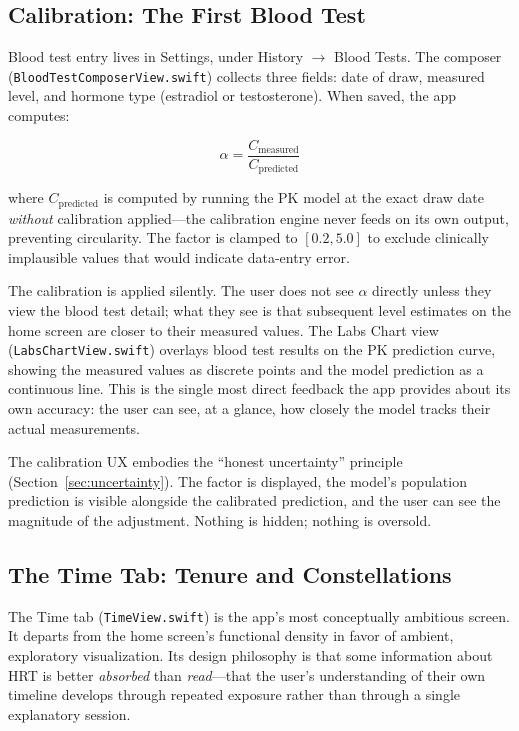 \documentclass[11pt,a4paper]{article}
\newcommand{\code}[1]{\texttt{\small #1}}
\begin{document}
\subsection{Calibration: The First Blood Test}
\label{sec:calibration}

Blood test entry lives in Settings, under History $\to$ Blood Tests. The
composer (\code{BloodTestComposerView.swift}) collects three fields:
date of draw, measured level, and hormone type (estradiol or
testosterone). When saved, the app computes:

\[
\alpha = \frac{C_{\text{measured}}}{C_{\text{predicted}}}
\]

where $C_{\text{predicted}}$ is computed by running the PK model at the
exact draw date \emph{without} calibration applied---the calibration
engine never feeds on its own output, preventing circularity. The factor
is clamped to $[0.2, 5.0]$ to exclude clinically implausible values that
would indicate data-entry error.

The calibration is applied silently. The user does not see $\alpha$
directly unless they view the blood test detail; what they see is that
subsequent level estimates on the home screen are closer to their
measured values. The Labs Chart view
(\code{LabsChartView.swift}) overlays blood test results on the PK
prediction curve, showing the measured values as discrete points and the
model prediction as a continuous line. This is the single most direct
feedback the app provides about its own accuracy: the user can see, at a
glance, how closely the model tracks their actual measurements.

The calibration UX embodies the ``honest uncertainty'' principle
(Section~\ref{sec:uncertainty}). The factor is displayed, the model's
population prediction is visible alongside the calibrated prediction, and
the user can see the magnitude of the adjustment. Nothing is hidden;
nothing is oversold.

\subsection{The Time Tab: Tenure and Constellations}
\label{sec:time_tab}

The Time tab (\code{TimeView.swift}) is the app's most conceptually
ambitious screen. It departs from the home screen's functional density in
favor of ambient, exploratory visualization. Its design philosophy is
that some information about HRT is better \emph{absorbed} than
\emph{read}---that the user's understanding of their own timeline
develops through repeated exposure rather than through a single
explanatory session.
\end{document}
